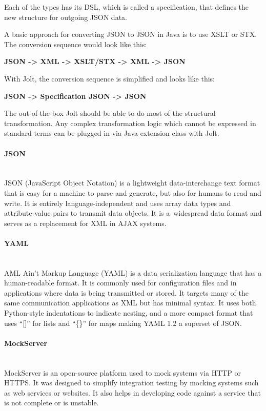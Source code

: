 Each of the types has its DSL, which is called a specification, that defines the new structure for outgoing JSON data.

A basic approach for converting JSON to JSON in Java is to use XSLT or STX. The conversion sequence would look like this:
\begin{center}
\textbf{JSON -> XML -> XSLT/STX -> XML -> JSON}
\end{center}

With Jolt, the conversion sequence is simplified and looks like this:
\begin{center}
\textbf{JSON -> Specification JSON -> JSON}
\end{center}

The out-of-the-box Jolt should be able to do most of the structural transformation. Any complex transformation logic which cannot be expressed in standard terms can be plugged in via Java extension class with Jolt.~\cite{jolt}

\paragraph{\large{JSON}}\mbox{}\\[2pt]
JSON (JavaScript Object Notation) is a lightweight data-interchange text format that is easy for a machine to parse and generate, but also for humans to read and write. It is entirely language-independent and uses array data types and attribute-value pairs to transmit data objects. It is a~widespread data format and serves as a replacement for XML in AJAX systems.~\cite{json}

\paragraph{\large{YAML}}\mbox{}\\[2pt]
AML Ain't Markup Language (YAML) is a data serialization language that has a human-readable format. It is commonly used for configuration files and in applications where data is being transmitted or stored. It targets many of the same communication applications as XML but has minimal syntax. It uses both Python-style indentations to indicate nesting, and a more compact format that uses ``[]'' for lists and ``\{\}'' for maps making YAML 1.2 a superset of JSON.~\cite{yaml}

\paragraph{\large{MockServer}}\mbox{}\\[2pt]
MockServer is an open-source platform used to mock systems via HTTP or HTTPS. It was designed to simplify integration testing by mocking systems such as web services or websites. It also helps in developing code against a service that is not complete or is unstable.~\cite{mockserver}

